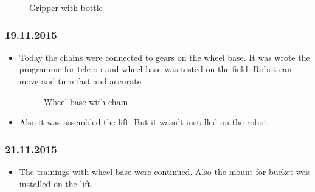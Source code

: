 \begin{itemize}
\begin{figure}[H]
\begin{minipage}[h]{1\linewidth}
		\caption{Gripper with bottle}
	\end{minipage}
\end{figure}
\end{itemize}
\subsubsection{19.11.2015}
\begin{itemize}
\item Today the chains were connected to gears on the wheel base. It was wrote the programme for tele op and wheel base was tested on the field. Robot can move and turn fast and accurate
\begin{figure}[H]
	\begin{minipage}[h]{1\linewidth}
		\caption{Wheel base with chain}
	\end{minipage}
\end{figure} 
\item Also it was assembled the lift. But it wasn't installed on the robot.
\end{itemize}
\subsubsection{21.11.2015}
\begin{itemize}
\item The trainings with wheel base were continued. Also the mount for bucket was installed on the lift.
\end{itemize}
